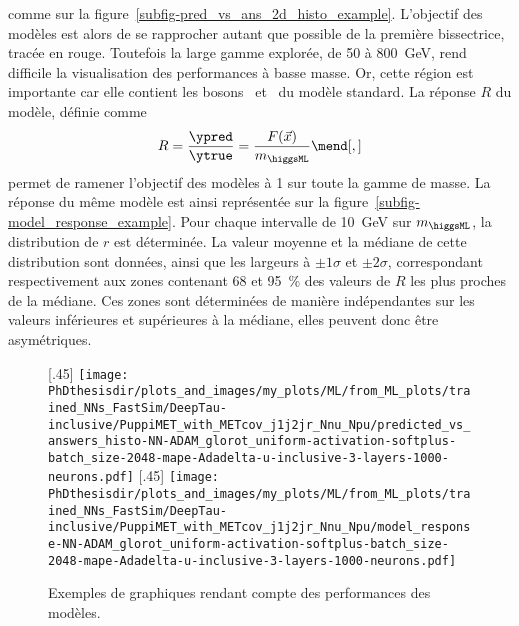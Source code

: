 comme sur la figure~\ref{subfig-pred_vs_ans_2d_histo_example}.
L'objectif des modèles est alors de se rapprocher autant que possible de la première bissectrice, tracée en rouge.
Toutefois
la large gamme explorée, de \num{50} à \SI{800}{\GeV}, rend difficile
la visualisation des performances à basse masse.
Or, cette région est importante car elle contient les bosons \Zboson\ et \higgs\ du modèle standard.
La réponse $R$ du modèle, définie comme
\begin{equation}
R = \frac{\ypred}{\ytrue} = \frac{F(\vec{x})}{m_{\higgsML}}
\mend[,]
\end{equation}
permet de ramener l'objectif des modèles à 1 sur toute la gamme de masse.
La réponse du même modèle est ainsi représentée sur la figure~\ref{subfig-model_response_example}.
Pour chaque intervalle de \SI{10}{\GeV} sur $m_{\higgsML}$,
la distribution de $r$ est déterminée.
La valeur moyenne et la médiane de cette distribution sont données,
ainsi que les largeurs à $\pm1\sigma$ et $\pm2\sigma$,
correspondant respectivement aux zones contenant \num{68} et \SI{95}{\%} des valeurs de $R$ les plus proches de la médiane.
Ces zones sont déterminées de manière indépendantes sur les valeurs inférieures et supérieures à la médiane,
elles peuvent donc être asymétriques.
\begin{figure}[h]
\centering

[.45\textwidth]
{\texttt{[image: \\PhDthesisdir/plots\_and\_images/my\_plots/ML/from\_ML\_plots/trained\_NNs\_FastSim/DeepTau-inclusive/PuppiMET\_with\_METcov\_j1j2jr\_Nnu\_Npu/predicted\_vs\_answers\_histo-NN-ADAM\_glorot\_uniform-activation-softplus-batch\_size-2048-mape-Adadelta-u-inclusive-3-layers-1000-neurons.pdf]}}
\hfill
{}[.45\textwidth]
{\texttt{[image: \\PhDthesisdir/plots\_and\_images/my\_plots/ML/from\_ML\_plots/trained\_NNs\_FastSim/DeepTau-inclusive/PuppiMET\_with\_METcov\_j1j2jr\_Nnu\_Npu/model\_response-NN-ADAM\_glorot\_uniform-activation-softplus-batch\_size-2048-mape-Adadelta-u-inclusive-3-layers-1000-neurons.pdf]}}

\caption{Exemples de graphiques rendant compte des performances des modèles.}
\label{fig-model_perfs_graphiques_examples}
\end{figure}
\par
